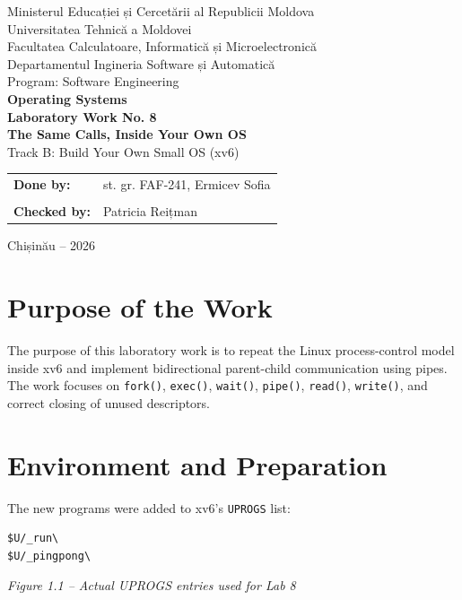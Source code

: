 \documentclass[12pt,a4paper]{article}
\newcommand{\figcap}[1]{\begin{center}\small\textit{#1}\end{center}\vspace{0.4em}}
\begin{document}
\begin{titlepage}
\begin{center}
{\large Ministerul Educației și Cercetării al Republicii Moldova}\\[0.3cm]
{\large Universitatea Tehnică a Moldovei}\\[0.3cm]
{\large Facultatea Calculatoare, Informatică și Microelectronică}\\[0.3cm]
{\large Departamentul Ingineria Software și Automatică}\\[0.3cm]
{\large Program: Software Engineering}\\[2.0cm]
{\Large \textbf{Operating Systems}}\\[0.8cm]
{\LARGE \textbf{Laboratory Work No. 8}}\\[0.5cm]
{\Large \textbf{The Same Calls, Inside Your Own OS}}\\[0.35cm]
{\large Track B: Build Your Own Small OS (xv6)}
\vfill
\begin{flushright}
\begin{tabular}{ll}
\textbf{Done by:} & st. gr. FAF-241, Ermicev Sofia \\
\\
\textbf{Checked by:} & Patricia Reițman
\end{tabular}
\end{flushright}
\vfill
{\large Chișinău -- 2026}
\end{center}
\end{titlepage}
\tableofcontents
\newpage

\section{Purpose of the Work}
The purpose of this laboratory work is to repeat the Linux process-control model inside xv6 and implement bidirectional parent-child communication using pipes. The work focuses on \texttt{fork()}, \texttt{exec()}, \texttt{wait()}, \texttt{pipe()}, \texttt{read()}, \texttt{write()}, and correct closing of unused descriptors.

\section{Environment and Preparation}
The new programs were added to xv6's \texttt{UPROGS} list:
\begin{lstlisting}
$U/_run\
$U/_pingpong\
\end{lstlisting}
\figcap{Figure 1.1 -- Actual UPROGS entries used for Lab 8}
\end{document}
